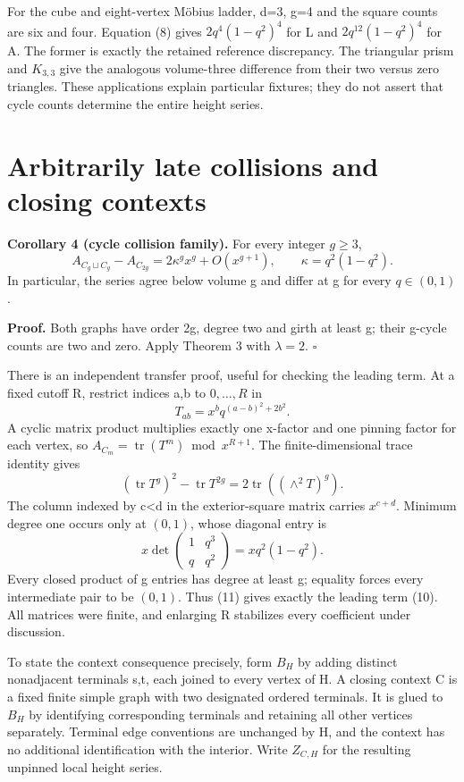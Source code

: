 \documentclass[
  11pt,
  a4paper,
]{article}
\begin{document}
For the cube and eight-vertex Möbius ladder, d=3, g=4 and the square
counts are six and four. Equation (8) gives \(2q^4(1-q^2)^4\) for L and
\(2q^{12}(1-q^2)^4\) for A. The former is exactly the retained reference
discrepancy. The triangular prism and \(K_{3,3}\) give the analogous
volume-three difference from their two versus zero triangles. These
applications explain particular fixtures; they do not assert that cycle
counts determine the entire height series.

\hypertarget{arbitrarily-late-collisions-and-closing-contexts}{%
\section{Arbitrarily late collisions and closing
contexts}\label{arbitrarily-late-collisions-and-closing-contexts}}

\textbf{Corollary 4 (cycle collision family).} For every integer
\(g\ge3\), \[
A_{C_g\sqcup C_g}-A_{C_{2g}}
=2\kappa^g x^g+O(x^{g+1}),
\qquad \kappa=q^2(1-q^2).
\tag{10}
\] In particular, the series agree below volume g and differ at g for
every \(q\in(0,1)\).

\textbf{Proof.} Both graphs have order 2g, degree two and girth at least
g; their g-cycle counts are two and zero. Apply Theorem 3 with
\(\lambda=2\). \(\square\)

There is an independent transfer proof, useful for checking the leading
term. At a fixed cutoff R, restrict indices a,b to \(0,\ldots,R\) in \[
T_{ab}=x^bq^{(a-b)^2+2b^2}.
\] A cyclic matrix product multiplies exactly one x-factor and one
pinning factor for each vertex, so
\(A_{C_m}=\operatorname{tr}(T^m)\bmod x^{R+1}\). The finite-dimensional
trace identity gives \[
(\operatorname{tr}T^g)^2-\operatorname{tr}T^{2g}
=2\operatorname{tr}((\wedge^2T)^g).
\tag{11}
\] The column indexed by c\textless d in the exterior-square matrix
carries \(x^{c+d}\). Minimum degree one occurs only at \((0,1)\), whose
diagonal entry is \[
x\det\begin{pmatrix}1&q^3\\q&q^2\end{pmatrix}
=xq^2(1-q^2).
\] Every closed product of g entries has degree at least g; equality
forces every intermediate pair to be \((0,1)\). Thus (11) gives exactly
the leading term (10). All matrices were finite, and enlarging R
stabilizes every coefficient under discussion.

To state the context consequence precisely, form \(B_H\) by adding
distinct nonadjacent terminals s,t, each joined to every vertex of H. A
closing context C is a fixed finite simple graph with two designated
ordered terminals. It is glued to \(B_H\) by identifying corresponding
terminals and retaining all other vertices separately. Terminal edge
conventions are unchanged by H, and the context has no additional
identification with the interior. Write \(Z_{C,H}\) for the resulting
unpinned local height series.
\end{document}
